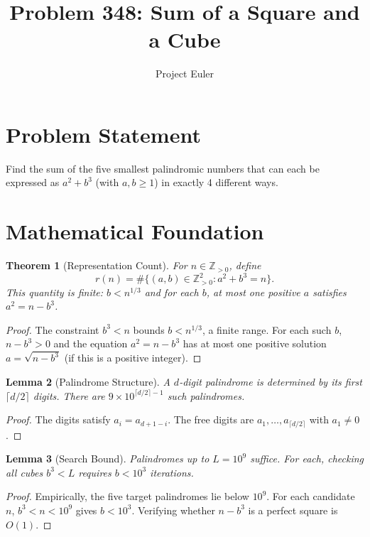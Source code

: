 \documentclass[a4paper,12pt]{article}
\title{Problem 348: Sum of a Square and a Cube}
\author{Project Euler}
\date{}
\newtheorem{theorem}{Theorem}
\newtheorem{lemma}[theorem]{Lemma}
\begin{document}
\maketitle

\section{Problem Statement}
Find the sum of the five smallest palindromic numbers that can each be expressed as $a^2 + b^3$ (with $a, b \ge 1$) in exactly 4 different ways.

\section{Mathematical Foundation}

\begin{theorem}[Representation Count]
For $n \in \mathbb{Z}_{>0}$, define
\[
r(n) = \#\{(a,b) \in \mathbb{Z}_{>0}^2 : a^2 + b^3 = n\}.
\]
This quantity is finite: $b < n^{1/3}$ and for each $b$, at most one positive $a$ satisfies $a^2 = n - b^3$.
\end{theorem}

\begin{proof}
The constraint $b^3 < n$ bounds $b < n^{1/3}$, a finite range. For each such $b$, $n - b^3 > 0$ and the equation $a^2 = n - b^3$ has at most one positive solution $a = \sqrt{n - b^3}$ (if this is a positive integer).
\end{proof}

\begin{lemma}[Palindrome Structure]
A $d$-digit palindrome is determined by its first $\lceil d/2 \rceil$ digits. There are $9 \times 10^{\lceil d/2 \rceil - 1}$ such palindromes.
\end{lemma}

\begin{proof}
The digits satisfy $a_i = a_{d+1-i}$. The free digits are $a_1, \ldots, a_{\lceil d/2\rceil}$ with $a_1 \ne 0$.
\end{proof}

\begin{lemma}[Search Bound]
Palindromes up to $L = 10^9$ suffice. For each, checking all cubes $b^3 < L$ requires $b < 10^3$ iterations.
\end{lemma}

\begin{proof}
Empirically, the five target palindromes lie below $10^9$. For each candidate $n$, $b^3 < n < 10^9$ gives $b < 10^3$. Verifying whether $n - b^3$ is a perfect square is $O(1)$.
\end{proof}
\end{document}
